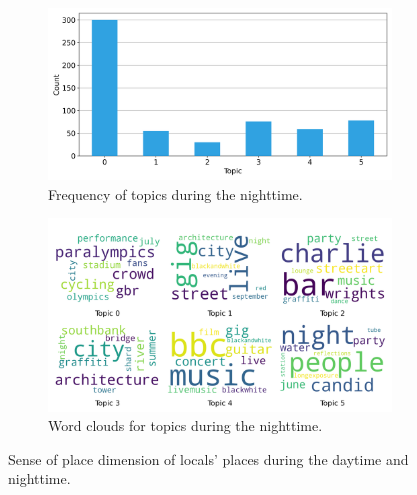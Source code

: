 \documentclass{article}
\theoremstyle{definition}
\theoremstyle{remark}
\begin{document}
\begin{figure}[!h]
    \begin{subfigure}{0.45\textwidth}
        \centering
        \includegraphics[width=\linewidth]{figures/places_sense_nighttime_locals.png}
        \caption{Frequency of topics during the nighttime.}
        \label{fig:places_sense_nighttime_locals}
    \end{subfigure}
    \hfill
    \begin{subfigure}{0.5\textwidth}
        \centering
        \includegraphics[width=\linewidth]{figures/topics_nighttime_locals.png}
        \caption{Word clouds for topics during the nighttime.}
        \label{fig:topics_nighttime_locals}
    \end{subfigure}

    \caption{Sense of place dimension of locals' places during the daytime and nighttime.}
    \label{fig:places_topics_sense_locals_day}
\end{figure}
\end{document}
